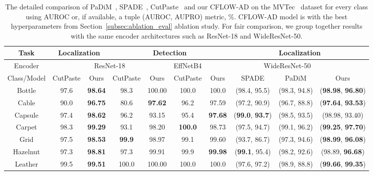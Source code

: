 \documentclass[10pt,twocolumn,letterpaper]{article}
\begin{document}
\begin{table*}[ht]
	\caption{The detailed comparison of PaDiM~\cite{defard2020padim}, SPADE~\cite{cohen2021subimage}, CutPaste~\cite{li2021cutpaste} and our CFLOW-AD on the MVTec~\cite{Bergmann_2019_CVPR} dataset for every class using AUROC or, if available, a tuple (AUROC, AUPRO) metric, \%. CFLOW-AD model is with the best hyperparameters from Section~\ref{subsec:ablation_eval} ablation study. For fair comparison, we group together results with the same encoder architectures such as ResNet-18 and WideResNet-50.}
	\label{tab:class-results}
	\centering
	\begin{tabular}{c|cc|cccc|ccc}
		\toprule
		Task & \multicolumn{2}{|c}{Localization} & \multicolumn{4}{|c}{Detection} & \multicolumn{3}{|c}{Localization} \\
		\midrule
		Encoder & \multicolumn{4}{|c|}{ResNet-18} & EffNetB4 & \multicolumn{4}{|c}{WideResNet-50} \\
		\midrule
		Class/Model& CutPaste & Ours & CutPaste & Ours & CutPaste & Ours & SPADE & PaDiM & Ours \\
		\midrule
		Bottle     & 97.6 & \textbf{98.64}        & 98.3 & 100.00         & 100.0& 100.0                   & (98.4, 95.5)          & (98.3, 94.8) & (\textbf{98.98}, \textbf{96.80}) \\
		Cable      & 90.0 & \textbf{96.75}        & 80.6 & \textbf{97.62} & 96.2 & 97.59                   & (97.2, 90.9)          & (96.7, 88.8) & (\textbf{97.64}, \textbf{93.53}) \\
		Capsule    & 97.4 & \textbf{98.62}        & 96.2 & 93.15          & 95.4 & \textbf{97.68}          & (\textbf{99.0}, \textbf{93.7}) & (98.5, 93.5) & (98.98, 93.40) \\
		Carpet     & 98.3 & \textbf{99.29}        & 93.1 & 98.20          & \textbf{100.0}& 98.73          & (97.5, 94.7)          & (99.1, 96.2) & (\textbf{99.25}, \textbf{97.70}) \\
		Grid       & 97.5 & \textbf{98.53}        & \textbf{99.9} & 98.97 & 99.1 & 99.60                   & (93.7, 86.7)          & (97.3, 94.6) & (\textbf{98.99}, \textbf{96.08}) \\
		Hazelnut   & 97.3 & \textbf{98.81}        & 97.3 & 99.91          & 99.9 & \textbf{99.98}          & (\textbf{99.1}, 95.4) & (98.2, 92.6) & (98.89, \textbf{96.68}) \\
		Leather    & 99.5 & \textbf{99.51}        & 100.0& 100.00         & 100.0& 100.0                   & (97.6, 97.2)          & (98.9, 88.8) & (\textbf{99.66}, \textbf{99.35}) \\

\end{tabular}
\end{table*}
\end{document}
